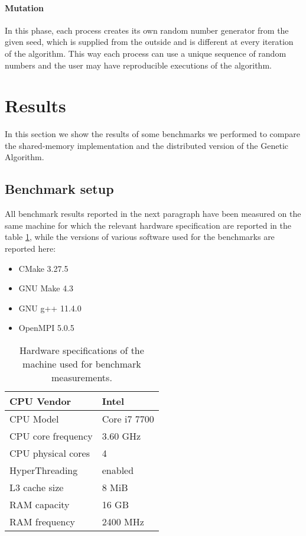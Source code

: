 \documentclass[12pt,a4paper,oneside]{article}
\begin{document}
	\paragraph{Mutation}
	In this phase, each process creates its own random number generator from the given seed, which is supplied from the outside and is different at every iteration of the algorithm.
	This way each process can use a unique sequence of random numbers and the user may have reproducible executions of the algorithm.
	
	\clearpage
	\section{Results}
	In this section we show the results of some benchmarks we performed to compare the shared-memory implementation and the distributed version of the Genetic Algorithm.

	\subsection{Benchmark setup}
	All benchmark results reported in the next paragraph have been measured on the same machine for which the relevant hardware specification are reported in the table \ref{hw-specs}, while the versions of various software used for the benchmarks are reported here:
	
	\begin{itemize}
		\item CMake 3.27.5
		\item GNU Make 4.3
		\item GNU g++ 11.4.0
		\item OpenMPI 5.0.5
	\end{itemize}

	\begin{table}[!ht]
		\centering
		\begin{tabular}{|l|l|}
			\hline
			CPU Vendor         & Intel        \\ \hline
			CPU Model          & Core i7 7700 \\ \hline
			CPU core frequency & 3.60 GHz     \\ \hline
			CPU physical cores & 4            \\ \hline
			HyperThreading     & enabled      \\ \hline
			L3 cache size      & 8 MiB        \\ \hline
			RAM capacity       & 16 GB        \\ \hline
			RAM frequency      & 2400 MHz     \\ \hline
		\end{tabular}
		\caption{Hardware specifications of the machine used for benchmark measurements.}
		\label{hw-specs}
	\end{table}
\end{document}
